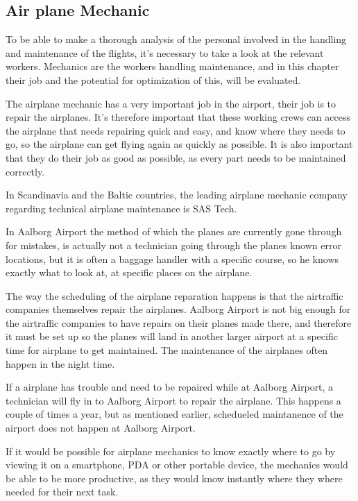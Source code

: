 \subsection{Air plane Mechanic}
To be able to make a thorough analysis of the personal involved in the handling and maintenance of the flights, it's necessary to take a look at the relevant workers. Mechanics are the workers handling maintenance, and in this chapter their job and the potential for optimization of this, will be evaluated.

The airplane mechanic has a very important job in the airport, their job is to repair the airplanes. It's therefore important that these working crews can access the airplane that needs repairing quick and easy, and know where they needs to go, so the airplane can get flying again as quickly as possible. It is also important that they do their job as good as possible, as every part needs to be maintained correctly.

In Scandinavia and the Baltic countries, the leading airplane mechanic company regarding technical airplane maintenance is SAS Tech\cite{sas_tech_mechanic}.

In Aalborg Airport the method of which the planes are currently gone through for mistakes, is actually not a technician going through the planes known error locations, but it is often a baggage handler with a specific course, so he knows exactly what to look at, at specific places on the airplane.

The way the scheduling of the airplane reparation happens is that the airtraffic companies themselves repair the airplanes. Aalborg Airport is not big enough for the airtraffic companies to have repairs on their planes made there, and therefore it must be set up so the planes will land in another larger airport at a specific time for airplane to get maintained. The maintenance of the airplanes often happen in the night time.

If a airplane has trouble and need to be repaired while at Aalborg Airport, a technician will fly in to Aalborg Airport to repair the airplane. This happens a couple of times a year, but as mentioned earlier, schedueled maintanence of the airport does not happen at Aalborg Airport.

If it would be possible for airplane mechanics to know exactly where to go by viewing it on a smartphone, PDA or other portable device, the mechanics would be able to be more productive, as they would know instantly where they where needed for their next task. 

